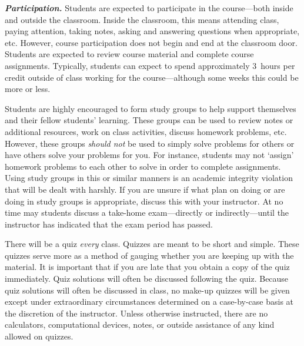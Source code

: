 \documentclass[11pt,letterpaper]{article}
\begin{document}
{\itshape\bfseries\color{stacred}Participation.} Students are expected to participate in the course---both inside and outside the classroom. Inside the classroom, this means attending class, paying attention, taking notes, asking and answering questions when appropriate, etc. However, course participation does not begin and end at the classroom door. Students are expected to review course material and complete course assignments. Typically, students can expect to spend approximately 3~hours per credit outside of class working for the course---although some weeks this could be more or less. \pspace

Students are highly encouraged to form study groups to help support themselves and their fellow students' learning. These groups can be used to review notes or additional resources, work on class activities, discuss homework problems, etc. However, these groups {\itshape should not} be used to simply solve problems for others or have others solve your problems for you. For instance, students may not `assign' homework problems to each other to solve in order to complete assignments. Using study groups in this or similar manners is an academic integrity violation that will be dealt with harshly. If you are unsure if what plan on doing or are doing in study groups is appropriate, discuss this with your instructor. At no time may students discuss a take-home exam---directly or indirectly---until the instructor has indicated that the exam period has passed. \pvspace{0.3cm}



There will be a quiz \textit{every} class. Quizzes are meant to be short and simple. These quizzes serve more as a method of gauging whether you are keeping up with the material. It is important that if you are late that you obtain a copy of the quiz immediately. Quiz solutions will often be discussed following the quiz. Because quiz solutions will often be discussed in class, no make-up quizzes will be given except under extraordinary circumstances determined on a case-by-case basis at the discretion of the instructor. Unless otherwise instructed, there are no calculators, computational devices, notes, or outside assistance of any kind allowed on quizzes. \pspace
\end{document}

